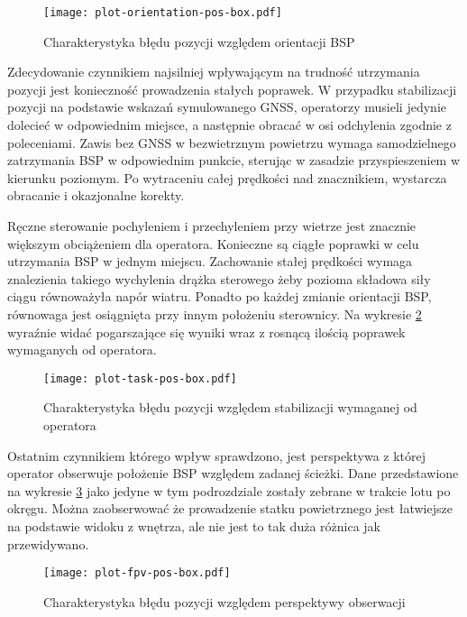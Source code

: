 \begin{figure}[!h]
    \centering \texttt{[image: plot-orientation-pos-box.pdf]}
    \caption{Charakterystyka błędu pozycji względem orientacji BSP}
    \label{fig:plot-orientation-pos-box}
\end{figure}

Zdecydowanie czynnikiem najsilniej wpływającym na trudność utrzymania pozycji jest konieczność prowadzenia stałych poprawek. W przypadku stabilizacji pozycji na podstawie wskazań symulowanego GNSS, operatorzy musieli jedynie dolecieć w odpowiednim miejsce, a następnie obracać w osi odchylenia zgodnie z poleceniami. Zawis bez GNSS w bezwietrznym powietrzu wymaga samodzielnego zatrzymania BSP w odpowiednim punkcie, sterując w zasadzie przyspieszeniem w kierunku poziomym. Po wytraceniu całej prędkości nad znacznikiem, wystarcza obracanie i okazjonalne korekty.

Ręczne sterowanie pochyleniem i przechyleniem przy wietrze jest znacznie większym obciążeniem dla operatora. Konieczne są ciągłe poprawki w celu utrzymania BSP w jednym miejscu. Zachowanie stałej prędkości wymaga znalezienia takiego wychylenia drążka sterowego żeby pozioma składowa siły ciągu równoważyła napór wiatru. Ponadto po każdej zmianie orientacji BSP, równowaga jest osiągnięta przy innym położeniu sterownicy. Na wykresie \ref{fig:plot-task-pos-box} wyraźnie widać pogarszające się wyniki wraz z rosnącą ilością poprawek wymaganych od operatora.

\begin{figure}[!h]
    \centering \texttt{[image: plot-task-pos-box.pdf]}
    \caption{Charakterystyka błędu pozycji względem stabilizacji wymaganej od operatora}
    \label{fig:plot-task-pos-box}
\end{figure}

Ostatnim czynnikiem którego wpływ sprawdzono, jest perspektywa z której operator obserwuje położenie BSP względem zadanej ścieżki. Dane przedstawione na wykresie \ref{fig:plot-fpv-pos-box} jako jedyne w tym podrozdziale zostały zebrane w trakcie lotu po okręgu. Można zaobserwować że prowadzenie statku powietrznego jest łatwiejsze na podstawie widoku z wnętrza, ale nie jest to tak duża różnica jak przewidywano.

\begin{figure}[!h]
    \centering \texttt{[image: plot-fpv-pos-box.pdf]}
    \caption{Charakterystyka błędu pozycji względem perspektywy obserwacji}
    \label{fig:plot-fpv-pos-box}
\end{figure}
